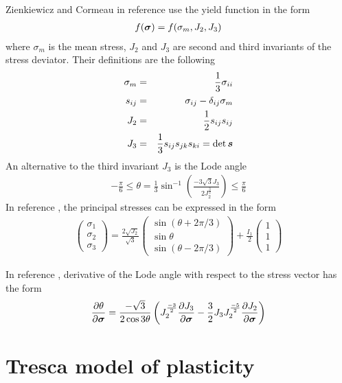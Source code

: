 Zienkiewicz and Cormeau in reference \cite{zienkiewicz:viscoplasticity} use the
yield function in the form
\begin{eqnarray}
f (\mbox{\boldmath$\sigma$}) = f(\sigma_m, J_2, J_3)
\end{eqnarray}
where $\sigma_m$ is the mean stress, $J_2$ and $J_3$ are second and third
invariants of the stress deviator. Their definitions are the following
\begin{eqnarray}
\sigma_m &=& \frac{1}{3} \sigma_{ii}
\\
s_{ij} &=& \sigma_{ij} - \delta_{ij} \sigma_m
\\
J_2 &=& \frac{1}{2} s_{ij} s_{ij}
\\
J_3 &=& \frac{1}{3} s_{ij} s_{jk} s_{ki} = \det \mbox{\boldmath$s$}
\end{eqnarray}
An alternative to the third invariant $J_3$ is the Lode  angle
\begin{eqnarray}
-\frac{\pi}{6} \leq \theta = \frac{1}{3} \sin^{-1}\left(\frac{-3 \sqrt{3} J_3}{2 J_2^{\frac{3}{2}}}\right) \leq \frac{\pi}{6}
\end{eqnarray}
In reference \cite{crisfield2}, the principal stresses can be expressed in the form
\begin{eqnarray}
\left(\begin{array}{c}
\sigma_1
\\
\sigma_2
\\
\sigma_3
\end{array}\right) = \frac{2\sqrt{J_2}}{\sqrt{3}}
\left(\begin{array}{c}
\sin (\theta + 2\pi/3)
\\
\sin \theta
\\
\sin (\theta - 2\pi/3)
\end{array}\right) + \frac{I_1}{2} \left(\begin{array}{c}
1
\\
1
\\
1
\end{array}\right)
\end{eqnarray}

In reference \cite{crisfield2}, derivative of the Lode angle with respect to the stress vector has the form
\begin{eqnarray}
\mbox{$\displaystyle\frac{\partial{\theta}}{\partial{\mbox{\boldmath$\sigma$}}}$} = \frac{-\sqrt{3}}{2 \cos 3\theta} \left(J_2^{-3 \over 2} \mbox{$\displaystyle\frac{\partial{J_3}}{\partial{\mbox{\boldmath$\sigma$}}}$} - \frac{3}{2} J_3 J_2^{-5 \over 2} \mbox{$\displaystyle\frac{\partial{J_2}}{\partial{\mbox{\boldmath$\sigma$}}}$}\right)
\end{eqnarray}

\section{Tresca model of plasticity}

